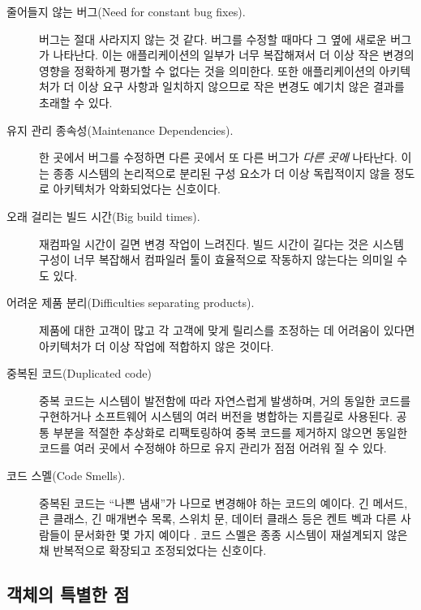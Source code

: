\documentclass[a4paper,10pt,twoside]{book}
\begin{document}
\begin{description}
  \item[줄어들지 않는 버그(Need for constant bug fixes).]
버그는 절대 사라지지 않는 것 같다. 버그를 수정할 때마다 그 옆에 새로운 버그가 나타난다. 이는 애플리케이션의 일부가 너무 복잡해져서 더 이상 작은 변경의 영향을 정확하게 평가할 수 없다는 것을 의미한다. 또한 애플리케이션의 아키텍처가 더 이상 요구 사항과 일치하지 않으므로 작은 변경도 예기치 않은 결과를 초래할 수 있다.

  \item[유지 관리 종속성(Maintenance Dependencies).]
한 곳에서 버그를 수정하면 다른 곳에서 또 다른 버그가 \emph{다른 곳에} 나타난다. 이는 종종 시스템의 논리적으로 분리된 구성 요소가 더 이상 독립적이지 않을 정도로 아키텍처가 악화되었다는 신호이다. 

  \item[오래 걸리는 빌드 시간(Big build times).]
재컴파일 시간이 길면 변경 작업이 느려진다. 빌드 시간이 길다는 것은 시스템 구성이 너무 복잡해서 컴파일러 툴이 효율적으로 작동하지 않는다는 의미일 수도 있다. 

  \item[어려운 제품 분리(Difficulties separating products).]
제품에 대한 고객이 많고 각 고객에 맞게 릴리스를 조정하는 데 어려움이 있다면 아키텍처가 더 이상 작업에 적합하지 않은 것이다.

  \item[중복된 코드(Duplicated code)] 
중복 코드는 시스템이 발전함에 따라 자연스럽게 발생하며, 거의 동일한 코드를 구현하거나 소프트웨어 시스템의 여러 버전을 병합하는 지름길로 사용된다. 공통 부분을 적절한 추상화로 리팩토링하여 중복 코드를 제거하지 않으면 동일한 코드를 여러 곳에서 수정해야 하므로 유지 관리가 점점 어려워 질 수 있다.

  \item[코드 스멜(Code Smells).] 
중복된 코드는 ``나쁜 냄새''가 나므로 변경해야 하는 코드의 예이다. 긴 메서드, 큰 클래스, 긴 매개변수 목록, 스위치 문, 데이터 클래스 등은 켄트 벡과 다른 사람들이 문서화한 몇 가지 예이다 \cite{Fowl99a}. 코드 스멜은 종종 시스템이 재설계되지 않은 채 반복적으로 확장되고 조정되었다는 신호이다.

\end{description}

\subsection*{객체의 특별한 점}
\end{document}
